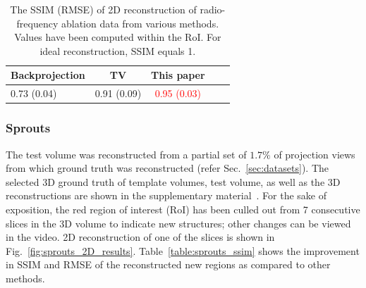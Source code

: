 \documentclass[journal]{IEEEtran}
\begin{document}
\begin{table}[!h]
  \centering
  \caption{The SSIM (RMSE) of 2D reconstruction of radio-frequency ablation data from various methods. Values have been computed within the RoI. For ideal reconstruction, SSIM equals 1.}
\begin{tabular}{|l|c|c|c|c|}
\hline \textbf{Backprojection} & \textbf{TV} &
\textbf{This paper} \\ \hline  0.73 (0.04)
& 0.91 (0.09) & \textcolor{red}{0.95 (0.03)} \\ \hline 
\end{tabular}
\label{table:tmh_ssim}
\end{table}



\subsubsection{\textbf{Sprouts}}
\label{Sec:sprouts_spatially_varying}

The test volume was reconstructed from a partial set of  
 $1.7\%$ of projection views
from which ground truth was reconstructed (refer
Sec.~\ref{sec:datasets}). The selected 3D ground truth of template
volumes, test volume, as well as the 3D reconstructions are shown in
the supplementary material~\cite{supp_paper}. For the sake of
exposition, the red region of interest (RoI) has been culled out from
7 consecutive slices in the 3D volume to indicate new structures;
other changes can be viewed in the video.  2D reconstruction of one of
the slices is shown in Fig.~\ref{fig:sprouts_2D_results}.
Table~\ref{table:sprouts_ssim} shows the improvement in SSIM and RMSE of the
reconstructed new regions as compared to other methods.
\end{document}
